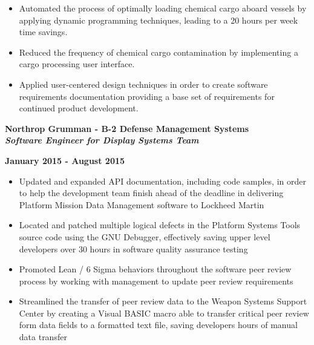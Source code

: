 \documentclass[10pt,letterpaper]{article}
\begin{document}
\begin{itemize}[noitemsep,topsep=0pt]
	\setlength\itemsep{-0.10em}
	\item Automated the process of optimally loading chemical cargo aboard
	      vessels by applying dynamic programming techniques, leading to a 20
	      hours per week time savings.
	\item Reduced the frequency of chemical cargo contamination by implementing
	      a cargo processing user interface.
	\item Applied user-centered design techniques in order to create software
	      requirements documentation providing a base set of requirements for continued product development.
	      
\end{itemize}

\medskip

\begin{minipage}[t]{0.53\textwidth}
	\begin{flushleft}
		\textbf{Northrop Grumman - B-2 Defense Management Systems}\\
		\textbf{\textit{Software Engineer for Display Systems Team}}\\
	\end{flushleft}
\end{minipage}
\begin{minipage}[t]{0.44\textwidth}
	\begin{flushright}
		\textbf{January 2015 - August 2015}
	\end{flushright}
\end{minipage}

\begin{itemize}[noitemsep,topsep=0pt]
	\setlength\itemsep{-0.10em}
	\item Updated and expanded API documentation, including code
	      samples, in order to help the development team finish ahead
	      of the deadline in delivering Platform Mission Data
	      Management software to Lockheed Martin
	\item Located and patched multiple logical defects in the
	      Platform Systems Tools source code using the GNU Debugger,
	      effectively saving upper level developers over 30 hours in
	      software quality assurance testing
	\item Promoted Lean / 6 Sigma behaviors throughout the
	      software peer review process by working with management to
	      update peer review requirements
	\item Streamlined the transfer of peer review data to the
	      Weapon Systems Support Center by creating a Visual BASIC
	      macro able to transfer critical peer review form data fields
	      to a formatted text file, saving developers hours of manual
	      data transfer
\end{itemize}
\end{document}
